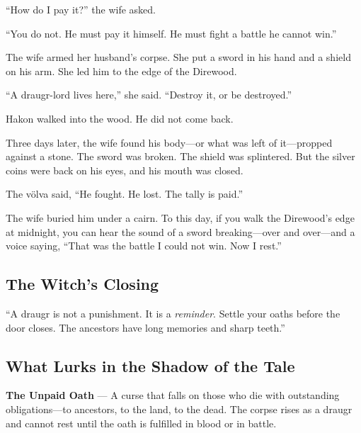 \documentclass[9pt,a5paper]{extbook}
\begin{document}
``How do I pay it?'' the wife asked.

``You do not. He must pay it himself. He must fight a battle he cannot win.''

The wife armed her husband's corpse. She put a sword in his hand and a shield on his arm. She led him to the edge of the Direwood.

``A draugr-lord lives here,'' she said. ``Destroy it, or be destroyed.''

Hakon walked into the wood. He did not come back.

Three days later, the wife found his body---or what was left of it---propped against a stone. The sword was broken. The shield was splintered. But the silver coins were back on his eyes, and his mouth was closed.

The völva said, ``He fought. He lost. The tally is paid.''

The wife buried him under a cairn. To this day, if you walk the Direwood's edge at midnight, you can hear the sound of a sword breaking---over and over---and a voice saying, ``That was the battle I could not win. Now I rest.''

\subsection*{The Witch's Closing}

``A draugr is not a punishment. It is a \textit{reminder}. Settle your oaths before the door closes. The ancestors have long memories and sharp teeth.''

\subsection*{What Lurks in the Shadow of the Tale}

\textbf{The Unpaid Oath} --- A curse that falls on those who die with outstanding obligations---to ancestors, to the land, to the dead. The corpse rises as a draugr and cannot rest until the oath is fulfilled in blood or in battle.
\end{document}
